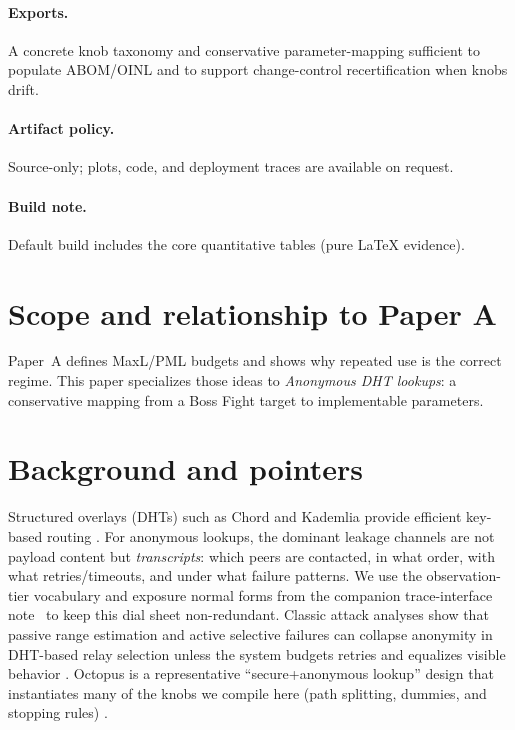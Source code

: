 \documentclass[11pt]{article}
\begin{document}
\paragraph{Exports.}
A concrete knob taxonomy and conservative parameter-mapping sufficient to populate ABOM/OINL and to support change-control recertification when knobs drift.

\paragraph{Artifact policy.}
Source-only; plots, code, and deployment traces are available on request.\cite{series:artifactpolicy}

\paragraph{Build note.}
Default build includes the core quantitative tables (pure \LaTeX{} evidence). 

\section{Scope and relationship to Paper A}\label{sec:scope}
Paper~A \cite{series:bossfightA} defines MaxL/PML budgets and shows why repeated use is the correct regime.
This paper specializes those ideas to \emph{Anonymous DHT lookups}:
a conservative mapping from a Boss Fight target to implementable parameters.

\section{Background and pointers}\label{sec:background}
Structured overlays (DHTs) such as Chord and Kademlia provide efficient key-based routing \cite{stoica2001chord,maymounkov2002kademlia}.
For anonymous lookups, the dominant leakage channels are not payload content but \emph{transcripts}: which peers are contacted, in what order, with what retries/timeouts, and under what failure patterns. We use the observation-tier vocabulary and exposure normal forms from the companion trace-interface note~\cite{series:traceifaces} to keep this dial sheet non-redundant.
Classic attack analyses show that passive range estimation and active selective failures can collapse anonymity in DHT-based relay selection unless the system budgets retries and equalizes visible behavior \cite{wang2010lookup}.
Octopus is a representative ``secure+anonymous lookup'' design that instantiates many of the knobs we compile here (path splitting, dummies, and stopping rules) \cite{wang2012octopus}.
\end{document}

